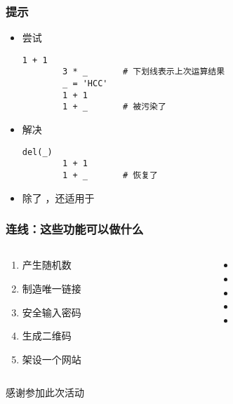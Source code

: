 \begin{frame} [fragile]
	\frametitle{提示}
	\begin{itemize}
	\item 尝试
		\begin{lstlisting}[style=pythonstyle, gobble=8, texcl, escapechar=@]
		1 + 1
		3 * _		# 下划线表示上次运算结果
		_ = 'HCC'
		1 + 1
		1 + _		# 被污染了
		\end{lstlisting}
	\item 解决
		\begin{lstlisting}[style=pythonstyle, gobble=8, texcl, escapechar=@]
		del(_)
		1 + 1
		1 + _		# 恢复了
		\end{lstlisting}
	\item 除了 \inlinePython{_} ，还适用于
	\end{itemize}
\end{frame}

\begin{frame} [fragile]
	\frametitle{连线：这些功能可以做什么}
	\linespread{1.5}
	\begin{columns}[T]
		\begin{column}[T]{.5\textwidth}
			\begin{enumerate}
			\item 产生随机数
			\item 制造唯一链接
			\item 安全输入密码
			\item 生成二维码
			\item 架设一个网站
			\end{enumerate}
		\end{column}
		\begin{column}[T]{.5\textwidth}
			\begin{itemize}
			\item {}
			\item {}
			\item {}
			\item {}
			\item {}
			\end{itemize}
		\end{column}
	\end{columns}
\end{frame}

\PreLastFrame
\begin{frame}
	\centerline{\fontsize{32}{32}\selectfont 感谢参加此次活动}
\end{frame}

\newpage


